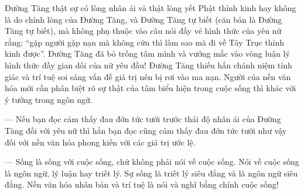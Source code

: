 Đường Tăng thật sự có lòng nhân ái và thật lòng yết Phật thỉnh kinh hay không là do chính lòng của Đường Tăng, và Đường Tăng tự biết (căn bản là Đường Tăng tự biết), mà không phụ thuộc vào câu nói đầy vẻ hình thức của yêu nữ rằng: ``gặp người gặp nạn mà không cứu thì làm sao mà đi về Tây Trục thỉnh kinh được''. Đường Tăng đã bỏ trống tâm mình và vướng mắc vào vòng luận lý hình thức đầy gian dối của nữ yêu đầu! Đường Tăng thiếu hẳn chánh niệm tỉnh giác và trí tuệ soi sáng vấn đề giá trị nên bị rơi vào ma nạn. Người của nền văn hóa mới cần phân biệt rõ sự thật của tâm biểu hiện trong cuộc sống thì khác với ý tưởng trong ngôn ngữ.

— Nếu bạn đọc cảm thấy đau đớn tức tưởi trước thái độ nhân ái của Đường Tăng đối với yêu nữ thì hẳn bạn đọc cũng cảm thấy đau đớn tức tưởi như vậy đối với nền văn hóa phong kiến với các giá trị ước lệ.

— Sống là sống với cuộc sống, chứ không phải nói về cuộc sống. Nói về cuộc sống là ngôn ngữ, lý luận hay triết lý. Sự sống là triết lý siêu đẳng và là ngôn ngữ siêu đẳng. Nền văn hóa nhân bản và trí tuệ là nói và nghĩ bằng chính cuộc sống!
